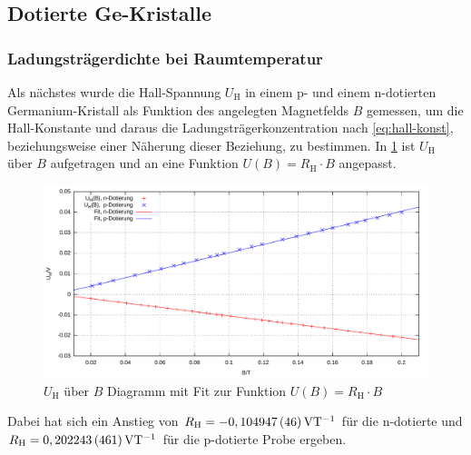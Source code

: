 \documentclass[numbers=noenddot,14pt,a4paper]{scrartcl}
\newcommand{\ix}[1]{_\text{#1}}
\begin{document}
\subsection{Dotierte Ge-Kristalle}
\subsubsection{Ladungsträgerdichte bei Raumtemperatur}
Als nächstes wurde die Hall-Spannung $U\ix{H}$ in einem p- und einem n-dotierten Germanium-Kristall als Funktion des angelegten Magnetfelds $B$ gemessen, um die Hall-Konstante und daraus die Ladungsträgerkonzentration nach \ref{eq:hall-konst}, beziehungsweise einer Näherung dieser Beziehung, zu bestimmen. In \ref{img:hall-konst} ist $U\ix{H}$ über $B$ aufgetragen und an eine Funktion $U(B)=R\ix{H}\cdot B$ angepasst.
\begin{figure}[H]
	\includegraphics[width=\textwidth]{messwerte/hallkonstanten.pdf}
	\caption{$U\ix{H}$ über $B$ Diagramm mit Fit zur Funktion $U(B)=R\ix{H}\cdot B$} \label{img:hall-konst}
\end{figure}
Dabei hat sich ein Anstieg von $R\ix{H}=\unit[-0,104947\,(46)]{VT^{-1}}$ für die n-dotierte und $R\ix{H}=\unit[0,202243\,(461)]{VT^{-1}}$ für die p-dotierte Probe ergeben.
\end{document}
